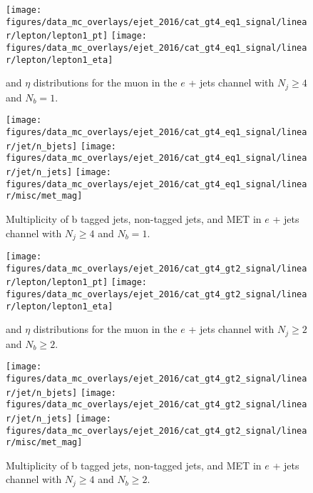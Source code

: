 
\begin{figure}[htb!]
    \centering
    \texttt{[image: figures/data\_mc\_overlays/ejet\_2016/cat\_gt4\_eq1\_signal/linear/lepton/lepton1\_pt]}
    \texttt{[image: figures/data\_mc\_overlays/ejet\_2016/cat\_gt4\_eq1\_signal/linear/lepton/lepton1\_eta]}
    \caption{\pt and $\eta$ distributions for the muon in the $e$ + jets
    channel with $N_{j} \geq 4$ and $N_{b} = 1$.
    \label{fig:ejet_1_kinematic}}
\end{figure}

\begin{figure}[htb!]
    \centering
    \texttt{[image: figures/data\_mc\_overlays/ejet\_2016/cat\_gt4\_eq1\_signal/linear/jet/n\_bjets]}
    \texttt{[image: figures/data\_mc\_overlays/ejet\_2016/cat\_gt4\_eq1\_signal/linear/jet/n\_jets]}
    \texttt{[image: figures/data\_mc\_overlays/ejet\_2016/cat\_gt4\_eq1\_signal/linear/misc/met\_mag]}
    \caption{Multiplicity of b tagged jets, non-tagged jets, and MET in
    $e$ + jets channel with $N_{j} \geq 4$ and $N_{b} = 1$.
    \label{fig:ejet_1_jetmet}}
\end{figure}

\begin{figure}[htb!]
    \centering
    \texttt{[image: figures/data\_mc\_overlays/ejet\_2016/cat\_gt4\_gt2\_signal/linear/lepton/lepton1\_pt]}
    \texttt{[image: figures/data\_mc\_overlays/ejet\_2016/cat\_gt4\_gt2\_signal/linear/lepton/lepton1\_eta]}
    \caption{\pt and $\eta$ distributions for the muon in the $e$ + jets
    channel with $N_{j} \geq 2$ and $N_{b} \geq 2$.
    \label{fig:ejet_2_kinematic}}
\end{figure}

\begin{figure}[htb!]
    \centering
    \texttt{[image: figures/data\_mc\_overlays/ejet\_2016/cat\_gt4\_gt2\_signal/linear/jet/n\_bjets]}
    \texttt{[image: figures/data\_mc\_overlays/ejet\_2016/cat\_gt4\_gt2\_signal/linear/jet/n\_jets]}
    \texttt{[image: figures/data\_mc\_overlays/ejet\_2016/cat\_gt4\_gt2\_signal/linear/misc/met\_mag]}
    \caption{Multiplicity of b tagged jets, non-tagged jets, and MET in
    $e$ + jets channel with $N_{j} \geq 4$ and $N_{b} \geq 2$.
    \label{fig:ejet_2_jetmet}}
\end{figure}
